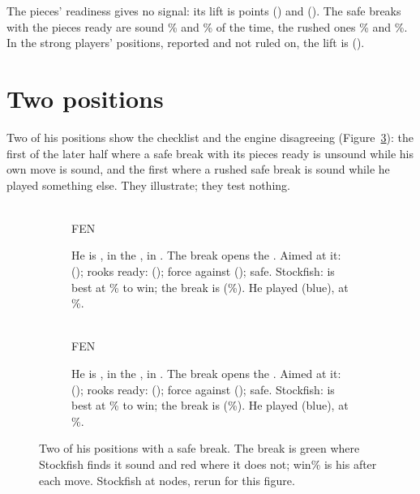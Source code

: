 \documentclass[11pt]{article}
\begin{document}
The pieces' readiness gives no signal: its lift is \LiftFirst{} points (\LiftFirstCi) and
\LiftSecond{} (\LiftSecondCi). The safe breaks with the pieces ready are sound \ReadySoundFirst\%
and \ReadySoundSecond\% of the time, the rushed ones \RushedSoundFirst\% and
\RushedSoundSecond\%. In the strong players' positions, reported and not ruled on, the lift is
\StrongLift{} (\StrongLiftCi).

\ControlTable

\section{Two positions}

Two of his positions show the checklist and the engine disagreeing (Figure~\ref{fig:examples}):
the first of the later half where a safe break with its pieces ready is unsound while his own move
is sound, and the first where a rushed safe break is sound while he played something else. They
illustrate; they test nothing.

\begin{figure}[ht]
\centering
\begin{subfigure}[t]{0.48\textwidth}
\centering
\EaBoard\\[0.3em]
{\footnotesize FEN \EaFen}
\caption{He is \EaMover, in the \EaPhase, in \EaStructure. The break \EaBreak{} opens the
\EaFiles. Aimed at it: \EaAimed\EaUndeveloped{} (\EaAimedOk); rooks ready: \EaRooks{}
(\EaRooksOk); force \EaForceUs{} against \EaForceThem{} (\EaForceOk); safe. Stockfish: \EaBest{}
is best at \EaWpBest\% to win; the break is \EaBreakSound{} (\EaWpBreak\%). He played \EaPlayed{}
(blue), \EaPlayedSound{} at \EaWpPlayed\%.}
\label{fig:ready}
\end{subfigure}\hfill
\begin{subfigure}[t]{0.48\textwidth}
\centering
\EbBoard\\[0.3em]
{\footnotesize FEN \EbFen}
\caption{He is \EbMover, in the \EbPhase, in \EbStructure. The break \EbBreak{} opens the
\EbFiles. Aimed at it: \EbAimed\EbUndeveloped{} (\EbAimedOk); rooks ready: \EbRooks{}
(\EbRooksOk); force \EbForceUs{} against \EbForceThem{} (\EbForceOk); safe. Stockfish: \EbBest{}
is best at \EbWpBest\% to win; the break is \EbBreakSound{} (\EbWpBreak\%). He played \EbPlayed{}
(blue), \EbPlayedSound{} at \EbWpPlayed\%.}
\label{fig:rushed}
\end{subfigure}
\caption{Two of his positions with a safe break. The break is green where Stockfish finds it
sound and red where it does not; win\% is his after each move. Stockfish at \GradeNodes{} nodes,
rerun for this figure.}
\label{fig:examples}
\end{figure}
\end{document}
